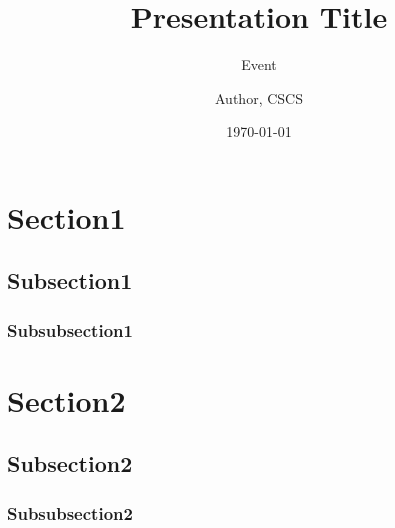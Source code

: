 \documentclass[aspectratio=43]{beamer}
\author{Author, CSCS}
\title{Presentation Title}
\subtitle{Event}
\date{\today}
\begin{document}
\cscstitle

\begin{frame}
\end{frame}


\section{Section1}
\subsection{Subsection1}
\subsubsection{Subsubsection1}

\section{Section2}
\subsection{Subsection2}
\subsubsection{Subsubsection2}

\end{document}
